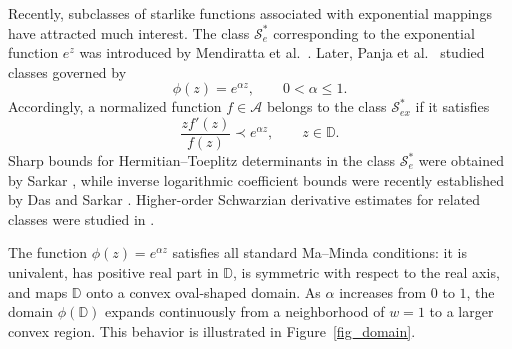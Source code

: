 \documentclass[11pt,reqno]{amsart}
\numberwithin{equation}{section}
\begin{document}
Recently, subclasses of starlike functions associated with exponential mappings have attracted much interest. The class $\mathcal{S}_e^*$ corresponding to the exponential function $e^z$ was introduced by Mendiratta et al.\ \cite{Mendiratta2015}. Later, Panja et al.\ \cite{Panja2026} studied classes governed by
\[
\phi(z)=e^{\alpha z},\qquad 0<\alpha\le1.
\]
Accordingly, a normalized function $f\in\mathcal{A}$ belongs to the class $\mathcal{S}_{ex}^{\ast}$ if it satisfies
\begin{equation}\label{subordination}
\frac{zf'(z)}{f(z)}\prec e^{\alpha z},\qquad z\in\mathbb{D}.
\end{equation}
Sharp bounds for Hermitian--Toeplitz determinants in the class $\mathcal{S}_e^*$ were obtained by Sarkar \cite{Sarkar}, while inverse logarithmic coefficient bounds were recently established by Das and Sarkar \cite{DasSarkar2026}. Higher-order Schwarzian derivative estimates for related classes were studied in \cite{Das2026a,Srivastava2026}.

The function $\phi(z)=e^{\alpha z}$ satisfies all standard Ma--Minda conditions: it is univalent, has positive real part in $\mathbb{D}$, is symmetric with respect to the real axis, and maps $\mathbb{D}$ onto a convex oval-shaped domain. As $\alpha$ increases from $0$ to $1$, the domain $\phi(\mathbb{D})$ expands continuously from a neighborhood of $w=1$ to a larger convex region. This behavior is illustrated in Figure~\ref{fig_domain}.
\end{document}
